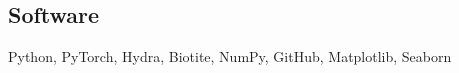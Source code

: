 \documentclass[letter]{res}
\begin{document}
\begin{resume}
\section{Software}
    Python, PyTorch, Hydra, Biotite, NumPy, GitHub, Matplotlib, Seaborn
 \vspace{-2mm}

\end{resume}
\end{document}
